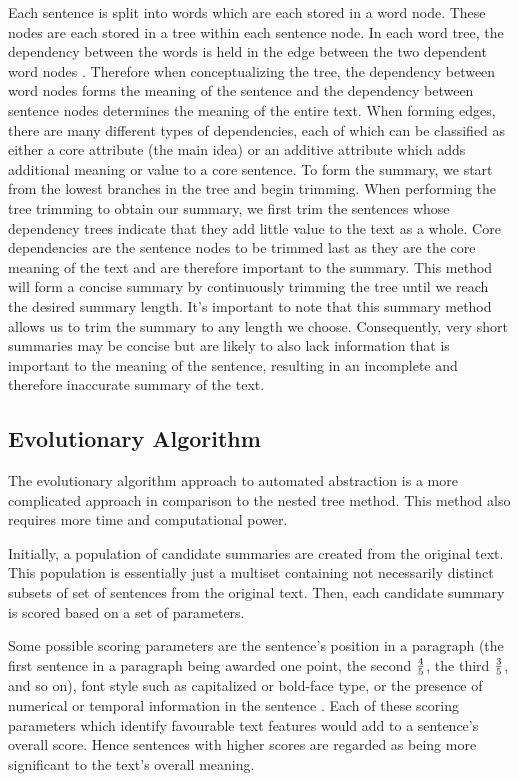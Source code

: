 Each sentence is split into words which are each stored in a word node. These nodes are each stored in a tree within each sentence node. In each word tree, the dependency between the words is held in the edge between the two dependent word nodes \cite{art3}. Therefore when conceptualizing the tree, the dependency between word nodes forms the meaning of the sentence and the dependency between sentence nodes determines the meaning of the entire text. When forming edges, there are many different types of dependencies, each of which can be classified as either a core attribute (\ie the main idea) or an additive attribute which adds additional meaning or value to a core sentence. To form the summary, we start from the lowest branches in the tree and begin trimming. When performing the tree trimming to obtain our summary, we first trim the sentences whose dependency trees indicate that they add little value to the text as a whole. Core dependencies are the sentence nodes to be trimmed last as they are the core meaning of the text and are therefore important to the summary. This method will form a concise summary by continuously trimming the tree until we reach the desired summary length. It's important to note that this summary method allows us to trim the summary to any length we choose. Consequently, very short summaries may be concise but are likely to also lack information that is important to the meaning of the sentence, resulting in an incomplete and therefore inaccurate summary of the text. 

\subsection{Evolutionary Algorithm}
The evolutionary algorithm approach to automated abstraction is a more complicated approach in comparison to the nested tree method. This method also requires more time and computational power.

Initially, a population of candidate summaries are created from the original text. This population is essentially just a multiset containing not necessarily distinct subsets of set of sentences from the original text. Then, each candidate summary is scored based on a set of parameters.

Some possible scoring parameters are the sentence's position in a paragraph (the first sentence in a paragraph being awarded one point, the second $4 \over 5$, the third $3\over 5$, and so on), font style such as capitalized or bold-face type, or the presence of numerical or temporal information in the sentence \cite{art1}. Each of these scoring parameters which identify favourable text features would add to a sentence's overall score. Hence sentences with higher scores are regarded as being more significant to the text's overall meaning.

